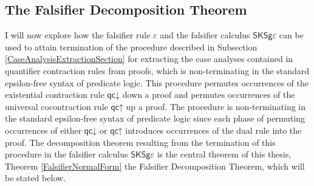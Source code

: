 \documentclass[10pt]{article}
\theoremstyle{definition}\newtheorem{remark}[theorem]{Remark}
\theoremstyle{definition}\newtheorem{example}[theorem]{Example}
\theoremstyle{definition}\newtheorem{definition}[theorem]{Definition}
\newcommand{\FalsifierCalculus}{{\mathsf{SKSg\varepsilon}}}
\newcommand{\qcUp}{{\mathsf{qc\mathord\uparrow}}}
\newcommand{\qcDown}{{\mathsf{qc\mathord\downarrow}}}
\newcommand{\falsifierRule}{{\mathsf{\varepsilon}}}
\begin{document}
	\subsection{The Falsifier Decomposition Theorem}\label{FalsifierDecompositionTheoremSection}
	
	I will now explore how the falsifier rule $\falsifierRule$ and the falsifier calculus $\FalsifierCalculus$ can be used to attain termination of the procedure described in Subsection \ref{CaseAnalysisExtractionSection} for extracting the case analyses contained in quantifier contraction rules from proofs, which is non-terminating in the standard epsilon-free syntax of predicate logic. This procedure permutes occurrences of the existential contraction rule $\qcDown$ down a proof and permutes occurrences of the universal cocontraction rule $\qcUp$ up a proof. The procedure is non-terminating in the standard epsilon-free syntax of predicate logic since each phase of permuting occurrences of either $\qcDown$ or $\qcUp$ introduces occurrences of the dual rule into the proof. The decomposition theorem resulting from the termination of this procedure in the falsifier calculus $\FalsifierCalculus$ is the central theorem of this thesis, Theorem \ref{FalsifierNormalForm} the Falsifier Decomposition Theorem, which will be stated below.
	
\end{document}
